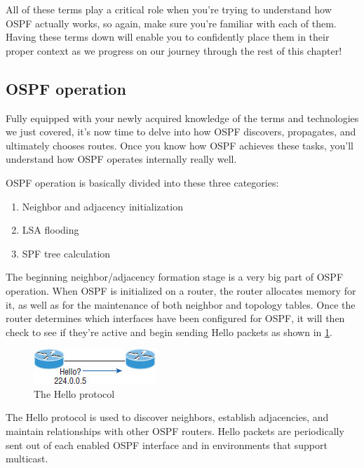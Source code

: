 All of these terms play a critical role when you're trying to understand
how OSPF actually works, so again, make sure you're familiar with each
of them. Having these terms down will enable you to confidently place
them in their proper context as we progress on our journey through the
rest of this chapter!



\subsection{OSPF operation}

Fully equipped with your newly acquired knowledge of the terms and
technologies we just covered, it's now time to delve into how OSPF
discovers, propagates, and ultimately chooses routes. Once you know how
OSPF achieves these tasks, you'll understand how OSPF operates
internally really well.

OSPF operation is basically divided into these three categories:

\begin{enumerate}
\item Neighbor and adjacency initialization
\item LSA flooding
\item SPF tree calculation
\end{enumerate}

The beginning neighbor/adjacency formation stage is a very big part of
OSPF operation. When OSPF is initialized on a router, the router
allocates memory for it, as well as for the maintenance of both neighbor
and topology tables. Once the router determines which interfaces have
been configured for OSPF, it will then check to see if they're active
and begin sending Hello packets as shown in \cref{fig:hello-protocol}.


\begin{figure}
   \centering
   \includegraphics[width=.4\textwidth]{images/c18f002.jpg}
   \caption{The Hello protocol}
   \label{fig:hello-protocol}
\end{figure}

The Hello protocol is used to discover neighbors, establish adjacencies,
and maintain relationships with other OSPF routers. Hello packets are
periodically sent out of each enabled OSPF interface and in environments
that support multicast.

